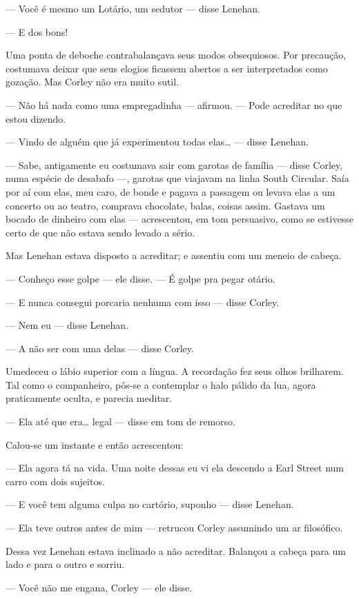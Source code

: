 --- Você é mesmo um Lotário, um sedutor --- disse Lenehan.

--- E dos bons!

Uma ponta de deboche contrabalançava seus modos obsequiosos. Por
precaução, costumava deixar que seus elogios ficassem abertos a ser
interpretados como gozação. Mas Corley não era muito sutil.

--- Não há nada como uma empregadinha --- afirmou. --- Pode acreditar no
que estou dizendo.

--- Vindo de alguém que já experimentou todas elas\ldots{} --- disse
Lenehan.

--- Sabe, antigamente eu costumava sair com garotas de família
--- disse Corley, numa espécie de desabafo ---, garotas que viajavam
na linha South Circular. Saía por aí com elas, meu caro, de bonde e
pagava a passagem ou levava elas a um concerto ou ao teatro, comprava
chocolate, balas, coisas assim. Gastava um bocado de dinheiro com
elas --- acrescentou, em tom persuasivo, como se estivesse certo de
que não estava sendo levado a sério.

Mas Lenehan estava disposto a acreditar; e assentiu com um meneio de
cabeça.

--- Conheço esse golpe --- ele disse. --- É golpe pra pegar otário.

--- E nunca consegui porcaria nenhuma com isso --- disse Corley.

--- Nem eu --- disse Lenehan.

--- A não ser com uma delas --- disse Corley.

Umedeceu o lábio superior com a língua. A recordação fez seus olhos
brilharem. Tal como o companheiro, pôs-se a contemplar o halo pálido
da lua, agora praticamente oculta, e parecia meditar.

--- Ela até que era\ldots{} legal --- disse em tom de remorso.

Calou-se um instante e então acrescentou:

--- Ela agora tá na vida. Uma noite dessas eu vi ela descendo a
Earl Street num carro com dois sujeitos.

--- E você tem alguma culpa no cartório, suponho --- disse
Lenehan.

--- Ela teve outros antes de mim --- retrucou Corley assumindo um ar
filosófico.

Dessa vez Lenehan estava inclinado a não acreditar. Balançou a cabeça
para um lado e para o outro e sorriu.

--- Você não me engana, Corley --- ele disse.

